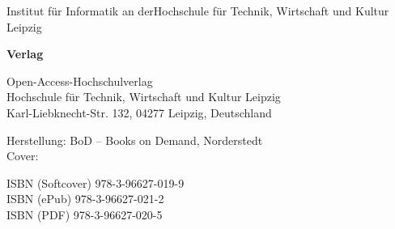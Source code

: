 \begin{flushleft}
Institut für Informatik an der\linebreak Hochschule für Technik, Wirtschaft und Kultur Leipzig

\vspace{1em}

\textbf{Verlag}

Open-Access-Hochschulverlag\\
Hochschule für Technik, Wirtschaft und Kultur Leipzig\\
Karl-Liebknecht-Str. 132, 04277 Leipzig, Deutschland

\vspace{1em}

Herstellung: BoD – Books on Demand, Norderstedt\\
Cover: 

\vspace{1em}

ISBN (Softcover) 978-3-96627-019-9\\
ISBN (ePub) 978-3-96627-021-2\\
ISBN (PDF) 978-3-96627-020-5
\end{flushleft}
\clearpage

\vfill
\clearpage
